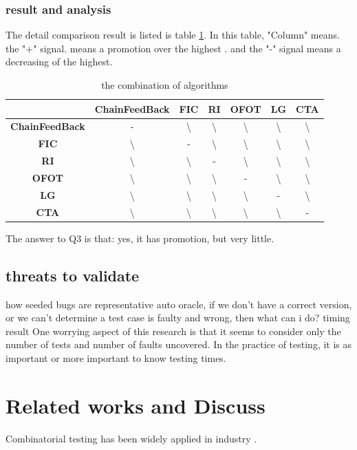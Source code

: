 \documentclass[10pt,journal,cspaper,compsoc]{IEEEtran}
\begin{document}
 \subsubsection{result and analysis}
 The detail comparison result is listed is table \ref{case-study3}. In this table, "Column" means. the "+" signal. means a promotion over the highest . and the "-" signal means a decreasing of the highest.
 \begin{table}\renewcommand{\arraystretch}{1.3}
  \caption{the combination of algorithms} \centering
  \label{case-study3}

  \begin{tabular}{c|c|c|c|c|c|c}
  \hline
   \ &  ChainFeedBack &   FIC   &  RI &  OFOT &  LG &  CTA\\
   \hline
   \bfseries ChainFeedBack & - & \textbackslash & \textbackslash & \textbackslash & \textbackslash & \textbackslash\\
   \bfseries FIC  & \textbackslash & - & \textbackslash & \textbackslash & \textbackslash & \textbackslash\\
   \bfseries  RI  & \textbackslash & \textbackslash & - & \textbackslash & \textbackslash & \textbackslash\\
   \bfseries OFOT  & \textbackslash & \textbackslash & \textbackslash & - & \textbackslash & \textbackslash\\
   \bfseries LG  & \textbackslash & \textbackslash & \textbackslash & \textbackslash & - & \textbackslash\\
   \bfseries CTA  & \textbackslash & \textbackslash & \textbackslash & \textbackslash & \textbackslash & -
  \end{tabular}
\end{table}

The answer to Q3 is that: yes, it has promotion, but very little.

\subsection{threats to validate}
how seeded bugs are representative
auto oracle, if we don't have a correct version, or we can't determine a test case is faulty and wrong, then what can i do?
timing result
One worrying aspect of this research is that it seems to consider only the number of tests and number of faults uncovered. In the practice of testing, it is as important or more important to know testing times.
\section{Related works and Discuss}\label{sec:related}
Combinatorial testing has been widely applied in industry \cite{nie2011survey}.
\end{document}
